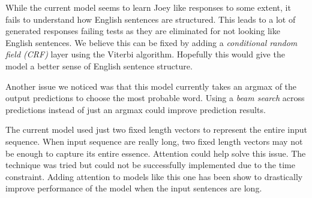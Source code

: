 While the current model seems to learn Joey like responses to some extent, it fails to understand how English sentences are structured. 
This leads to a lot of generated responses failing tests as they are eliminated for not looking like English sentences. 
We believe this can be fixed by adding a \emph{conditional random field (CRF)} layer using the Viterbi algorithm.
Hopefully this would give the model a better sense of English sentence structure. 
   
Another issue we noticed was that this model currently takes an argmax of the output predictions to choose the most probable word. 
Using a \emph{beam search} across predictions instead of just an argmax could improve prediction results.
    
The current model used just two fixed length vectors to represent the entire input sequence. 
When input sequence are really long, two fixed length vectors may not be enough to capture its entire essence. 
Attention could help solve this issue. 
The technique was tried but could not be successfully implemented due to the time constraint. 
Adding attention to models like this one has been show to drastically improve performance of the model when the input sentences are long.